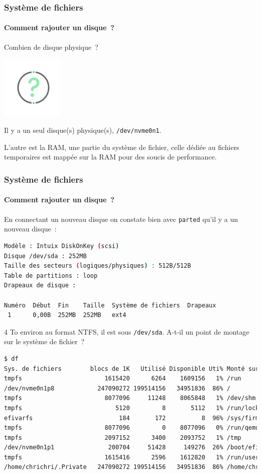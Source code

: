 \documentclass{beamer}
\begin{document}
    \begin{frame}
        \transdissolve
        \frametitle{Système de fichiers}
        \framesubtitle{Comment rajouter un disque~?}
        Combien de disque physique~?
        \begin{center}
            \includegraphics[width=3cm]{image/question-mark}
        \end{center}
        \pause
        \begin{dangercolorbox}
            Il y a un seul disque(s) physique(s), \lstinline{/dev/nvme0n1}.

            L'autre est la RAM, une partie du système de fichier, celle dédiée au fichiers temporaires est mappée sur la RAM pour des soucis de performance.
        \end{dangercolorbox}
    \end{frame}

    \begin{frame}[fragile]
        \transdissolve
        \frametitle{Système de fichiers}
        \framesubtitle{Comment rajouter un disque~?}
        \begin{scriptsize}
            En connectant un nouveau disque on constate bien avec \lstinline{parted} qu'il y a un nouveau disque~:
            \begin{lstlisting}[language=bash,basicstyle=\tiny\ttfamily]
Modèle : Intuix DiskOnKey (scsi)
Disque /dev/sda : 252MB
Taille des secteurs (logiques/physiques) : 512B/512B
Table de partitions : loop
Drapeaux de disque :

Numéro  Début  Fin    Taille  Système de fichiers  Drapeaux
 1      0,00B  252MB  252MB   ext4
            \end{lstlisting}
            4 To environ au format NTFS, il est sous \lstinline{/dev/sda}.
            A-t-il un point de montage sur le système de fichier~?
            \begin{lstlisting}[language=bash,basicstyle=\tiny\ttfamily]
$ df
Sys. de fichiers        blocs de 1K   Utilisé Disponible Uti% Monté sur
tmpfs                       1615420      6264    1609156   1% /run
/dev/nvme0n1p8            247090272 199514156   34951836  86% /
tmpfs                       8077096     11248    8065848   1% /dev/shm
tmpfs                          5120         8       5112   1% /run/lock
efivarfs                        184       172          8  96% /sys/firmware/efi/efivars
tmpfs                       8077096         0    8077096   0% /run/qemu
tmpfs                       2097152      3400    2093752   1% /tmp
/dev/nvme0n1p1               200704     51428     149276  26% /boot/efi
tmpfs                       1615416      2596    1612820   1% /run/user/1000
/home/chrichri/.Private   247090272 199514156   34951836  86% /home/chrichri/Private
            \end{lstlisting}
        \end{scriptsize}
    \end{frame}
\end{document}
